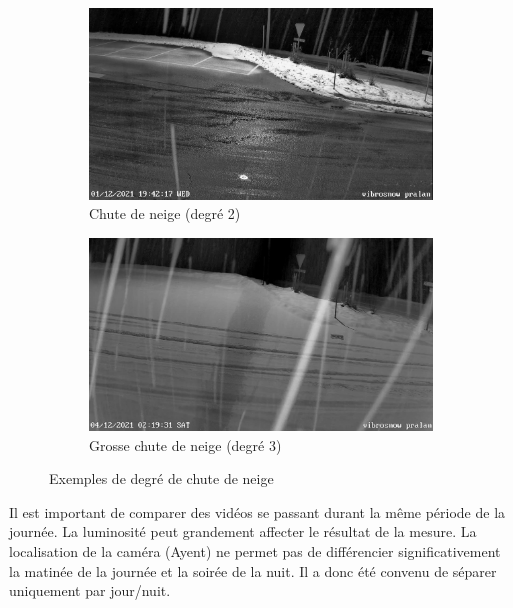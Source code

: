 \begin{figure}[H]
    \begin{subfigure}{.45\textwidth}
        \includegraphics[width=\linewidth]{Images/computer_vision/snowfall/exemple_snow.PNG}
        \caption{Chute de neige (degré 2)}
        \label{fig:Snowfall_exempleSnow}
    \end{subfigure}
    \hfill
    \begin{subfigure}{.45\textwidth}
        \includegraphics[width=\linewidth]{Images/computer_vision/snowfall/exemple_lotOfSnow.PNG}
        \caption{Grosse chute de neige (degré 3)}
        \label{fig:Snowfall_exempleLotOfSnow}
    \end{subfigure}
    \hfill
    \caption{Exemples de degré de chute de neige}
    \label{fig:Snowfall_exemples}
\end{figure}

Il est important de comparer des vidéos se passant durant la même période de la journée.
La luminosité peut grandement affecter le résultat de la mesure. La localisation
de la caméra (Ayent) ne permet pas de différencier significativement la matinée
de la journée et la soirée de la nuit. Il a donc été convenu de séparer uniquement
par jour/nuit.


